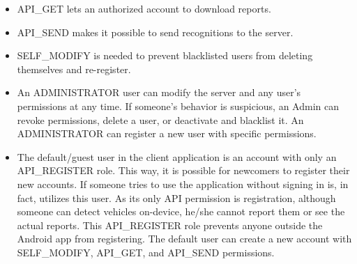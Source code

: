 \begin{itemize}
  \item API\_GET lets an authorized account to download reports.
  \item API\_SEND makes it possible to send recognitions to the server.
  \item SELF\_MODIFY is needed to prevent blacklisted users from deleting themselves and re-register.
  \item An ADMINISTRATOR user can modify the server and any user’s permissions at any time. If someone’s behavior is suspicious, an Admin can revoke permissions, delete a user, or deactivate and blacklist it. An ADMINISTRATOR can register a new user with specific permissions.
  \item The default/guest user in the client application is an account with only an API\_REGISTER role. This way, it is possible for newcomers to register their new accounts. If someone tries to use the application without signing in is, in fact, utilizes this user. As its only API permission is registration, although someone can detect vehicles on-device, he/she cannot report them or see the actual reports. This API\_REGISTER role prevents anyone outside the Android app from registering. The default user can create a new account with SELF\_MODIFY, API\_GET, and API\_SEND permissions.
\end{itemize}
